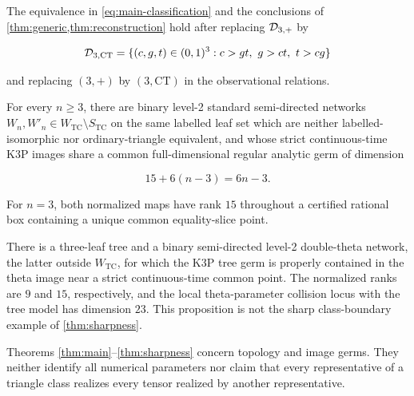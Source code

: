 \begin{corollary}\label{cor:ct-main}
The equivalence in \eqref{eq:main-classification} and the conclusions of
\cref{thm:generic,thm:reconstruction} hold after replacing \(\mathcal D_{3,+}\) by

\[
 \Dct=\{(c,g,t)\in(0,1)^3:c>gt,\ g>ct,\ t>cg\}
\]

and replacing \((3,+)\) by \((3,\mathrm{CT})\) in the observational relations.
\end{corollary}

\begin{theorem}\label{thm:sharpness}
For every \(n\ge3\), there are binary level-2 standard semi-directed networks
\(W_n,W'_n\in W_{\mathrm{TC}}\setminus S_{\mathrm{TC}}\) on the same labelled
leaf set which are neither labelled-isomorphic nor ordinary-triangle
equivalent, and whose strict continuous-time K3P images share a common
full-dimensional regular analytic germ of dimension

\[
 15+6(n-3)=6n-3.
\]

For \(n=3\), both normalized maps have rank \(15\) throughout a certified
rational box containing a unique common equality-slice point.
\end{theorem}

\begin{proposition}\label{prop:outer}
There is a three-leaf tree and a binary semi-directed level-2 double-theta
network, the latter outside \(W_{\mathrm{TC}}\), for which the K3P tree germ
is properly contained in the theta image near a strict continuous-time common
point.  The normalized ranks are \(9\) and \(15\), respectively, and the
local theta-parameter collision locus with the tree model has dimension
\(23\).  This proposition is not the sharp class-boundary example of
\cref{thm:sharpness}.
\end{proposition}

Theorems \ref{thm:main}--\ref{thm:sharpness} concern topology and image
germs.  They neither identify all numerical parameters nor claim that every
representative of a triangle class realizes every tensor realized by another
representative.
